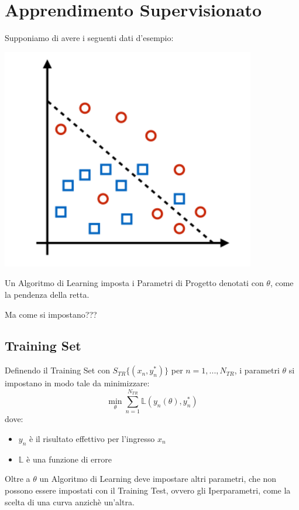 \section{Apprendimento Supervisionato}
Supponiamo di avere i seguenti dati d'esempio:
\begin{center}
    \includegraphics[width=\textwidth/2]{Images/SetEsempio.png}
\end{center}
Un Algoritmo di Learning imposta i Parametri di Progetto denotati con $\theta$, come la pendenza della retta.
\\
\begin{center}
    Ma come si impostano???
\end{center}
\subsection{Training Set}
Definendo il Training Set con $S_{TR}\{ (x_n, y_n^*)\}$ per $n=1,...,N_{TR}$, i parametri $\theta$ si impostano in modo tale da minimizzare:
\begin{equation*}
    \min_\theta \sum_{n=1}^{N_{TR}} \mathbb{L}(y_n(\theta), y_n^*)
\end{equation*}
dove:
\begin{itemize}
    \item $y_n$ è il risultato effettivo per l'ingresso $x_n$
    \item $\mathbb{L}$ è una funzione di errore
\end{itemize}
Oltre a $\theta$ un Algoritmo di Learning deve impostare altri parametri, che non possono essere impostati con il Training Test, ovvero gli Iperparametri, come la scelta di una curva anzichè un'altra.

